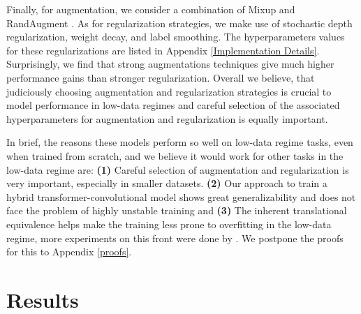 \documentclass{article} \usepackage{iclr2023_conference,times}
\begin{document}
Finally, for augmentation, we consider a combination of Mixup \citep{zhang2017mixup} and RandAugment \citep{cubuk2020randaugment}. As for regularization strategies, we make use of stochastic depth regularization, weight decay, and label smoothing. The hyperparameters values for these regularizations are listed in Appendix \ref{Implementation Details}. Surprisingly, we find that strong augmentations techniques give much higher performance gains than stronger regularization. Overall we believe, that judiciously choosing augmentation and regularization strategies is crucial to model performance in low-data regimes and careful selection of the associated hyperparameters for augmentation and regularization is equally important.

 In brief, the reasons these models perform so well on low-data regime tasks, even when trained from scratch, and we believe it would work for other tasks in the low-data regime are: \textbf{(1)} Careful selection of augmentation and regularization is very important, especially in smaller datasets. \textbf{(2)} Our approach to train a hybrid transformer-convolutional model shows great generalizability and does not face the problem of highly unstable training and \textbf{(3)} The inherent translational equivalence helps  make the training less prone to overfitting in the low-data regime, more experiments on this front were done by \cite{https://doi.org/10.48550/arxiv.2004.09691}. We postpone the proofs for this to Appendix \ref{proofs}.

\section{Results}
\label{Results}
\end{document}
